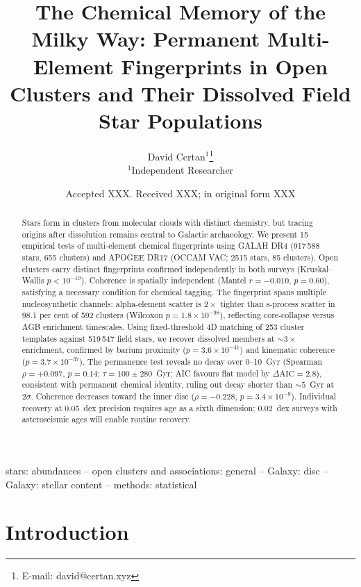 \documentclass[fleqn,usenatbib]{mnras}
\title[Chemical Memory of the Milky Way]{The Chemical Memory of the Milky Way: Permanent Multi-Element Fingerprints in Open Clusters and Their Dissolved Field Star Populations}
\author[D. Certan]{David Certan$^{1}$\thanks{E-mail: david@certan.xyz}\\
$^{1}$Independent Researcher}
\date{Accepted XXX. Received XXX; in original form XXX}
\begin{document}
\label{firstpage}
\pagerange{\pageref{firstpage}--\pageref{lastpage}}
\maketitle

\begin{abstract}
Stars form in clusters from molecular clouds with distinct chemistry, but tracing origins after dissolution remains central to Galactic archaeology.
We present 15 empirical tests of multi-element chemical fingerprints using GALAH DR4 (917\,588 stars, 655 clusters) and APOGEE DR17 (OCCAM VAC; 2515 stars, 85 clusters).
Open clusters carry distinct fingerprints confirmed independently in both surveys (Kruskal--Wallis $p < 10^{-10}$).
Coherence is spatially independent (Mantel $r = -0.010$, $p = 0.60$), satisfying a necessary condition for chemical tagging.
The fingerprint spans multiple nucleosynthetic channels: alpha-element scatter is $2\times$ tighter than s-process scatter in 98.1 per cent of 592 clusters (Wilcoxon $p = 1.8 \times 10^{-98}$), reflecting core-collapse versus AGB enrichment timescales.
Using fixed-threshold 4D matching of 253 cluster templates against 519\,547 field stars, we recover dissolved members at ${\sim}3\times$ enrichment, confirmed by barium proximity ($p = 3.6 \times 10^{-41}$) and kinematic coherence ($p = 3.7 \times 10^{-37}$).
The permanence test reveals no decay over 0--10~Gyr (Spearman $\rho = +0.097$, $p = 0.14$; $\tau = 100 \pm 280$~Gyr; AIC favours flat model by $\Delta\mathrm{AIC} = 2.8$), consistent with permanent chemical identity, ruling out decay shorter than ${\sim}5$~Gyr at $2\sigma$.
Coherence decreases toward the inner disc ($\rho = -0.228$, $p = 3.4 \times 10^{-9}$).
Individual recovery at 0.05~dex precision requires age as a sixth dimension; 0.02~dex surveys with asteroseismic ages will enable routine recovery.
\end{abstract}

\begin{keywords}
stars: abundances -- open clusters and associations: general -- Galaxy: disc -- Galaxy: stellar content -- methods: statistical
\end{keywords}



\section{Introduction}
\label{sec:intro}
\end{document}
